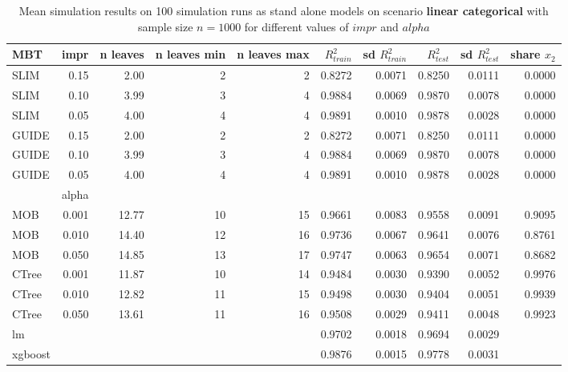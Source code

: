 \begin{table}[!htb]

\caption{Mean simulation results on 100 simulation runs as stand alone models on scenario \textbf{linear categorical} with sample size $n = 1000$ for different values of $impr$ and $alpha$}
\centering \tiny
\begin{tabular}[t]{l|r|r|r|r|r|r|r|r|r}
\hline
MBT & impr  & n leaves & n leaves min & n leaves max & $R^2_{train}$ & sd $R^2_{train}$ & $R^2_{test}$ & sd $R^2_{test}$ & share $x_2$\\
\hline

\hline
SLIM & 0.15 & 2.00 & 2 & 2 & 0.8272 & 0.0071 & 0.8250 & 0.0111 & 0.0000\\
SLIM & 0.10 & 3.99 & 3 & 4 & 0.9884 & 0.0069 & 0.9870 & 0.0078 & 0.0000\\
SLIM & 0.05 & 4.00 & 4 & 4 & 0.9891 & 0.0010 & 0.9878 & 0.0028 & 0.0000\\
GUIDE & 0.15 & 2.00 & 2 & 2 & 0.8272 & 0.0071 & 0.8250 & 0.0111 & 0.0000\\
GUIDE & 0.10 & 3.99 & 3 & 4 & 0.9884 & 0.0069 & 0.9870 & 0.0078 & 0.0000\\
GUIDE & 0.05 & 4.00 & 4 & 4 & 0.9891 & 0.0010 & 0.9878 & 0.0028 & 0.0000\\
\hline

  & alpha & & & & & & & & \\
\hline
MOB & 0.001 & 12.77 & 10 & 15 & 0.9661 & 0.0083 & 0.9558 & 0.0091 & 0.9095\\
MOB & 0.010 & 14.40 & 12 & 16 & 0.9736 & 0.0067 & 0.9641 & 0.0076 & 0.8761\\
MOB & 0.050 & 14.85 & 13 & 17 & 0.9747 & 0.0063 & 0.9654 & 0.0071 & 0.8682\\
CTree & 0.001 & 11.87 & 10 & 14 & 0.9484 & 0.0030 & 0.9390 & 0.0052 & 0.9976\\
CTree & 0.010 & 12.82 & 11 & 15 & 0.9498 & 0.0030 & 0.9404 & 0.0051 & 0.9939\\
CTree & 0.050 & 13.61 & 11 & 16 & 0.9508 & 0.0029 & 0.9411 & 0.0048 & 0.9923\\
\hline
lm & & & & & 0.9702 & 0.0018 & 0.9694 & 0.0029 &\\
xgboost & & & & & 0.9876 & 0.0015 & 0.9778 & 0.0031 & \\
\hline

\end{tabular}
\label{tab:linear_abrupt_summary} 
\end{table}



